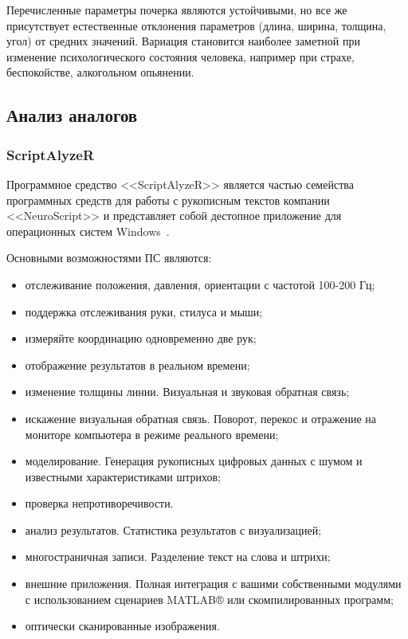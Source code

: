 Перечисленные параметры почерка являются устойчивыми, но все же присутствует естественные отклонения параметров (длина, ширина, толщина, угол) от средних значений. Вариация становится наиболее заметной при изменение психологического состояния человека, например при страхе, беспокойстве, алкогольном опьянении.

\subsection{Анализ аналогов}
\label{sub:domain:analogs}

\subsubsection{ScriptAlyzeR}
\label{sub:domain:analogs:neuro_script} 

Программное средство <<ScriptAlyzeR>> является частью семейства программных средств для работы с рукописным текстов компании <<NeuroScript>> и представляет собой дестопное приложение для операционных систем Windows~\cite{analogs_scriptAlyzer}.

Основными возможностями ПС являются:
\begin{itemize}
  \item отслеживание положения, давления, ориентации с частотой 100-200 Гц;
	\item поддержка отслеживания руки, стилуса и мыши;
	\item измеряйте координацию одновременно две рук;
	\item отображение результатов в реальном времени;
	\item изменение толщины линии. Визуальная и звуковая обратная связь;
	\item искажение визуальная обратная связь. Поворот, перекос и отражение на мониторе компьютера в режиме реального времени;
	\item моделирование. Генерация рукописных цифровых данных с шумом и известными характеристиками штрихов;
	\item проверка непротиворечивости.
	\item анализ результатов. Статистика результатов с визуализацией;
	\item многостраничная записи. Разделение текст на слова и штрихи;
	\item внешние приложения. Полная интеграция с вашими собственными модулями с использованием сценариев MATLAB® или скомпилированных программ;
	\item оптически сканированные изображения.
\end{itemize}

